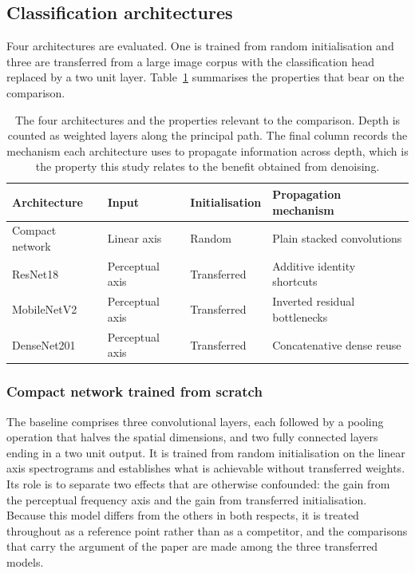 \documentclass[pdflatex,sn-mathphys-num]{sn-jnl}
\begin{document}
\subsection{Classification architectures}\label{sec:d-arch}

Four architectures are evaluated. One is trained from random initialisation
and three are transferred from a large image corpus with the classification
head replaced by a two unit layer. Table~\ref{tab:arch} summarises the
properties that bear on the comparison.

\begin{table}[t]
\centering
\footnotesize
\caption{The four architectures and the properties relevant to the
comparison. Depth is counted as weighted layers along the principal path. The
final column records the mechanism each architecture uses to propagate
information across depth, which is the property this study relates to the
benefit obtained from denoising.}
\label{tab:arch}
\begin{tabular}{@{}llll@{}}
\toprule
Architecture & Input & Initialisation & Propagation mechanism \\
\midrule
Compact network & Linear axis & Random & Plain stacked convolutions \\
ResNet18 & Perceptual axis & Transferred & Additive identity shortcuts \\
MobileNetV2 & Perceptual axis & Transferred & Inverted residual bottlenecks \\
DenseNet201 & Perceptual axis & Transferred & Concatenative dense reuse \\
\bottomrule
\end{tabular}
\end{table}

\subsubsection{Compact network trained from scratch}\label{sec:d-cnn}

The baseline comprises three convolutional layers, each followed by a pooling
operation that halves the spatial dimensions, and two fully connected layers
ending in a two unit output. It is trained from random initialisation on the
linear axis spectrograms and establishes what is achievable without
transferred weights. Its role is to separate two effects that are otherwise
confounded: the gain from the perceptual frequency axis and the gain from
transferred initialisation. Because this model differs from the others in both
respects, it is treated throughout as a reference point rather than as a
competitor, and the comparisons that carry the argument of the paper are made
among the three transferred models.
\end{document}

